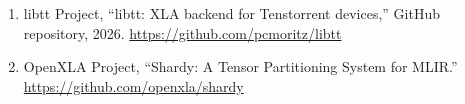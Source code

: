 \documentclass[
  10pt,
  american,
  10pt,
  letterpaper]{article}
\providecommand{\tightlist}{%
  \setlength{\itemsep}{0pt}\setlength{\parskip}{0pt}}
\begin{document}
\begin{enumerate}
  \begin{enumerate}
  \def\labelenumii{\arabic{enumii}.}
  \setcounter{enumii}{2025}
  \tightlist
  \item
    \url{https://docs.tenstorrent.com/systems/galaxy-blackhole/index.html}
  \end{enumerate}
\item
  libtt Project, ``libtt: XLA backend for Tenstorrent devices,'' GitHub
  repository, 2026. \url{https://github.com/pcmoritz/libtt}
\item
  OpenXLA Project, ``Shardy: A Tensor Partitioning System for MLIR.''
  \url{https://github.com/openxla/shardy}
\end{enumerate}
\end{document}
